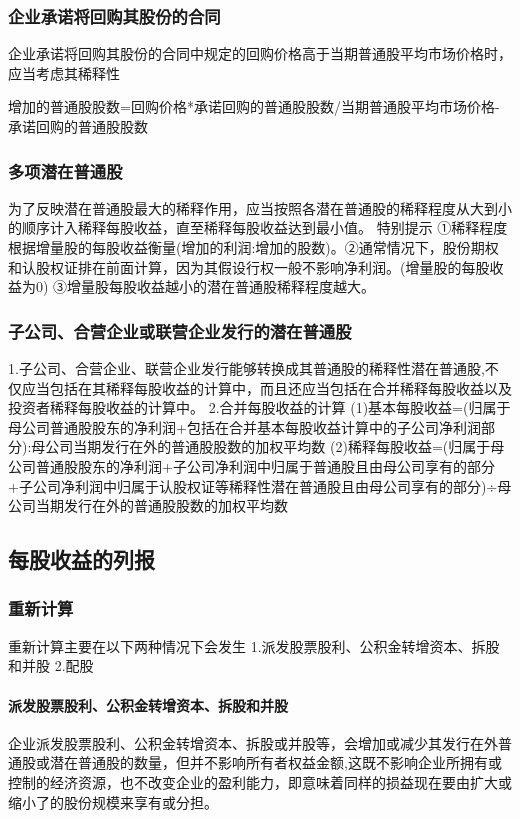 \documentclass[UTF8,12pt]{ctexart}
\numberwithin{equation}{section} %
\numberwithin{figure}{section}
\numberwithin{table}{section}
\begin{document}
	\subsubsection{企业承诺将回购其股份的合同}
	企业承诺将回购其股份的合同中规定的回购价格高于当期普通股平均市场价格时，应当考虑其稀释性
	
	增加的普通股股数=回购价格*承诺回购的普通股股数/当期普通股平均市场价格-承诺回购的普通股股数
	
	\subsubsection{多项潜在普通股}
	为了反映潜在普通股最大的稀释作用，应当按照各潜在普通股的稀释程度从大到小的顺序计入稀释每股收益，直至稀释每股收益达到最小值。
	特别提示
	①稀释程度根据增量股的每股收益衡量(增加的利润:增加的股数)。②通常情况下，股份期权和认股权证排在前面计算，因为其假设行权一般不影响净利润。(增量股的每股收益为0)
	③增量股每股收益越小的潜在普通股稀释程度越大。
	
	\subsubsection{子公司、合营企业或联营企业发行的潜在普通股}
	1.子公司、合营企业、联营企业发行能够转换成其普通股的稀释性潜在普通股,不仅应当包括在其稀释每股收益的计算中，而且还应当包括在合并稀释每股收益以及投资者稀释每股收益的计算中。
	2.合并每股收益的计算
	(1)基本每股收益=(归属于母公司普通股股东的净利润+包括在合并基本每股收益计算中的子公司净利润部分):母公司当期发行在外的普通股股数的加权平均数
	(2)稀释每股收益=(归属于母公司普通股股东的净利润+子公司净利润中归属于普通股且由母公司享有的部分+子公司净利润中归属于认股权证等稀释性潜在普通股且由母公司享有的部分)÷母公司当期发行在外的普通股股数的加权平均数
	
	
	\subsection{每股收益的列报}
	\subsubsection{重新计算}
	重新计算主要在以下两种情况下会发生
	1.派发股票股利、公积金转增资本、拆股和并股
	2.配股
	
	\paragraph{派发股票股利、公积金转增资本、拆股和并股}
	企业派发股票股利、公积金转增资本、拆股或并股等，会增加或减少其发行在外普通股或潜在普通股的数量，但并不影响所有者权益金额,这既不影响企业所拥有或控制的经济资源，也不改变企业的盈利能力，即意味着同样的损益现在要由扩大或缩小了的股份规模来享有或分担。
	
\end{document}
